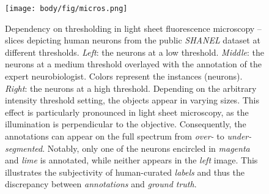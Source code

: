\begin{figure}[ht]
\texttt{[image: body/fig/micros.png]}
\caption{
Dependency on thresholding in light sheet fluorescence microscopy -- slices depicting human neurons from the public \emph{SHANEL} dataset \citep{zhao2020cellular} at different thresholds.
\emph{Left}: the neurons at a low threshold.
\emph{Middle}: the neurons at a medium threshold overlayed with the annotation of the expert neurobiologist.
Colors represent the instances (neurons).
\emph{Right}: the neurons at a high threshold.
Depending on the arbitrary intensity threshold setting, the objects appear in varying sizes.
This effect is particularly pronounced in light sheet microscopy, as the illumination is perpendicular to the objective.
Consequently, the annotations can appear on the full spectrum from \emph{over-} to \emph{under-segmented}.
Notably, only one of the neurons encircled in \emph{magenta} and \emph{lime} is annotated, while neither appears in the \emph{left} image.
This illustrates the subjectivity of human-curated \emph{labels} and thus the discrepancy between \emph{annotations} and \emph{ground truth}.
}
\label{fig:micros}
\end{figure}